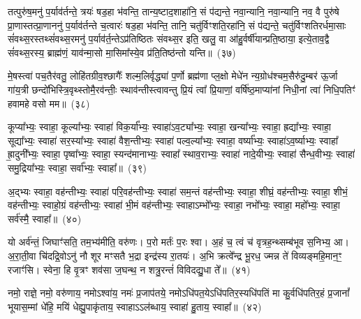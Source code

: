 तत्पुरु॑ष॒मनु॑ प॒र्याव॑र्तन्ते॒ त्रयः॑ षड॒हा भ॑वन्ति॒ तान्य॒ष्टाद॒शाहा॑नि॒ सं प॑द्यन्ते॒ नवा॒न्यानि॒ नवा॒न्यानि॒ नव॒ वै पुरु॑षे प्रा॒णास्तत्प्रा॒णाननु॑ प॒र्याव॑र्तन्ते च॒त्वारः॑ षड॒हा भ॑वन्ति॒ तानि॒ चतु॑र्विꣳशति॒रहा॑नि॒ सं प॑द्यन्ते॒ चतु॑र्विꣳशतिरर्धमा॒साः सं॑वथ्स॒रस्तथ्सं॑वथ्स॒रमनु॑ प॒र्याव॑र्त॒न्ते\-ऽप्र॑तिष्ठितः संवथ्स॒र इति॒ खलु॒ वा आ॑हु॒र्वर्\mbox{}षी॑यान्प्रति॒ष्ठाया॒ इत्ये॒ताव॒द्वै सं॑वथ्स॒रस्य॒ ब्राह्म॑णं॒ याव॑न्मा॒सो मा॒सिमा᳚स्ये॒व प्र॑ति॒तिष्ठ॑न्तो यन्ति॥~(३७)\ip

{\anuvakamend[{वि॒राज॑मे॒तेन॑ द्वाद॒शावे॒ताव॒द्वा अ॒ष्टौ च॑}]}%

मे॒षस्त्वा॑ पच॒तैर॑वतु॒ लोहि॑तग्रीव॒श्छागैः᳚ शल्म॒लिर्वृद्ध्या॑ प॒र्णो ब्रह्म॑णा प्ल॒क्षो मेधे॑न न्य॒ग्रोध॑श्चम॒सैरु॑दु॒म्बर॑ ऊ॒र्जा गा॑य॒त्री छन्दो॑भिस्त्रि॒वृथ्स्तोमै॒रव॑न्तीः॒ स्थाव॑न्तीस्त्वावन्तु प्रि॒यं त्वा᳚ प्रि॒याणां॒ वर्\mbox{}षि॑ष्ठ॒माप्या॑नां निधी॒नां त्वा॑ निधि॒पतिꣳ॑ हवामहे वसो मम॥~(३८)\ip

{\anuvakamend[{मे॒षः षट्त्रिꣳ॑शत्}]}%

कूप्या᳚भ्यः॒ स्वाहा॒ कूल्या᳚भ्यः॒ स्वाहा॑ विक॒र्या᳚भ्यः॒ स्वाहा॑\-ऽव॒ट्या᳚भ्यः॒ स्वाहा॒ खन्या᳚भ्यः॒ स्वाहा॒ ह्रद्या᳚भ्यः॒ स्वाहा॒ सूद्या᳚भ्यः॒ स्वाहा॑ सर॒स्या᳚भ्यः॒ स्वाहा॑ वैश॒न्तीभ्यः॒ स्वाहा॑ पल्व॒ल्या᳚भ्यः॒ स्वाहा॒ वर्ष्या᳚भ्यः॒ स्वाहा॑\-ऽव॒र्ष्याभ्यः॒ स्वाहा᳚ ह्रा॒दुनी᳚भ्यः॒ स्वाहा॒ पृष्वा᳚भ्यः॒ स्वाहा॒ स्यन्द॑मानाभ्यः॒ स्वाहा᳚ स्थाव॒राभ्यः॒ स्वाहा॑ नादे॒यीभ्यः॒ स्वाहा॑ सैन्ध॒वीभ्यः॒ स्वाहा॑ समु॒द्रिया᳚भ्यः॒ स्वाहा॒ सर्वा᳚भ्यः॒ स्वाहा᳚॥~(३९)\ip

{\anuvakamend[{कूप्या᳚भ्यश्चत्वारि॒ꣳ॒शत्}]}%

अ॒द्भ्यः स्वाहा॒ वह॑न्तीभ्यः॒ स्वाहा॑ परि॒वह॑न्तीभ्यः॒ स्वाहा॑ सम॒न्तं वह॑न्तीभ्यः॒ स्वाहा॒ शीघ्रं॒ वह॑न्तीभ्यः॒ स्वाहा॒ शीभं॒ वह॑न्तीभ्यः॒ स्वाहो॒ग्रं वह॑न्तीभ्यः॒ स्वाहा॑ भी॒मं वह॑न्तीभ्यः॒ स्वाहा\-ऽम्भो᳚भ्यः॒ स्वाहा॒ नभो᳚भ्यः॒ स्वाहा॒ महो᳚भ्यः॒ स्वाहा॒ सर्व॑स्मै॒ स्वाहा᳚॥~(४०)\ip

{\anuvakamend[{अ॒द्भ्य एका॒न्नत्रि॒ꣳ॒शत्}]}%

यो अर्व॑न्तं॒ जिघाꣳ॑सति॒ तम॒भ्य॑मीति॒ वरु॑णः। प॒रो मर्तः॑ प॒रः श्वा। अ॒हं च॒ त्वं च॑ वृत्रह॒न्थ्सम्ब॑भूव स॒निभ्य॒ आ। अ॒रा॒ती॒वा चि॑दद्रि॒वो\-ऽनु॑ नौ शूर मꣳसतै भ॒द्रा इन्द्र॑स्य रा॒तयः॑। अ॒भि क्रत्वे᳚न्द्र भू॒रध॒ ज्मन्न ते॑ विव्यङ्महि॒मान॒ꣳ॒ रजाꣳ॑सि। स्वेना॒ हि वृ॒त्रꣳ शव॑सा ज॒घन्थ॒ न शत्रु॒रन्तं॑ विविदद्यु॒धा ते᳚॥~(४१)\ip

{\anuvakamend[{वि॒वि॒दद्द्वे च॑}]}%

नमो॒ राज्ञे॒ नमो॒ वरु॑णाय॒ नमो\-ऽश्वा॑य॒ नमः॑ प्र॒जा\-प॑तये॒ नमो\-ऽधि॑पत॒ये\-ऽधि॑\-पतिर॒स्यधि॑\-पतिं मा कु॒र्वधि॑\-पतिर॒हं प्र॒जानां᳚ भूयास॒म्मां धे॑हि॒ मयि॑ धेह्यु॒पाकृ॑ताय॒ स्वाहा\-ऽऽ\-ल॑ब्धाय॒ स्वाहा॑ हु॒ताय॒ स्वाहा᳚॥~(४२)\ip

